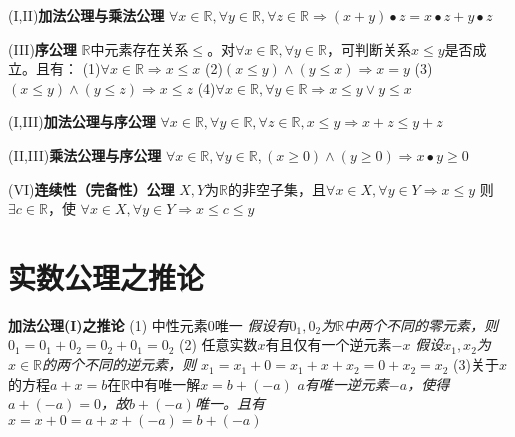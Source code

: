 \documentclass[11pt]{article}
\begin{document}
(I,II)\textbf{加法公理与乘法公理} \newline
$\forall x \in \mathbb{R}, \forall y \in \mathbb{R}, \forall z \in\mathbb{R} \Rightarrow (x+y) \bullet z=x \bullet z+y \bullet z$ \newline

(III)\textbf{序公理} \newline
$\mathbb{R}$中元素存在关系$\le$。对$\forall x \in \mathbb{R}, \forall y \in \mathbb{R}$，可判断关系$x \le y$是否成立。且有：\newline
(1)$\forall x \in \mathbb{R} \Rightarrow x \le x$ \newline
(2)$(x \le y) \land (y \le x) \Rightarrow x=y$ \newline
(3)$(x \le y) \land (y \le z) \Rightarrow x \le z$ \newline
(4)$\forall x \in \mathbb{R}, \forall y \in \mathbb{R} \Rightarrow x \le y \lor y \le x$ \newline

(I,III)\textbf{加法公理与序公理} \newline
$\forall x \in \mathbb{R}, \forall y \in \mathbb{R}, \forall z \in \mathbb{R}, x \le y \Rightarrow x+z \le y+z$ \newline

(II,III)\textbf{乘法公理与序公理} \newline
$\forall x \in \mathbb{R}, \forall y \in \mathbb{R}, (x \ge 0) \land (y \ge 0) \Rightarrow x \bullet y \ge 0$ \newline

(VI)\textbf{连续性（完备性）公理} \newline
$X, Y$为$\mathbb{R}$的非空子集，且$\forall x \in X, \forall y \in Y \Rightarrow x \le y$
则$\exists c \in \mathbb{R}$，使 \newline
$\forall x \in X, \forall y \in Y \Rightarrow x \le c \le y$ \newline

\section{实数公理之推论}
\textbf{加法公理(I)之推论} \newline
(1) 中性元素$0$唯一 \newline
\textit{假设有$0_1, 0_2$为$\mathbb{R}$中两个不同的零元素，则
$0_1=0_1+0_2=0_2+0_1=0_2$} \newline
(2) 任意实数$x$有且仅有一个逆元素$-x$ \newline
\textit{假设$x_1, x_2$为$x \in \mathbb{R}$的两个不同的逆元素，则
$x_1=x_1+0=x_1+x+x_2=0+x_2=x_2$} \newline
(3)关于$x$的方程$a+x=b$在$\mathbb{R}$中有唯一解$x=b+(-a)$ \newline
\textit{$a$有唯一逆元素$-a$，使得$a+(-a)=0$，故$b+(-a)$唯一。且有
$x=x+0=a+x+(-a)=b+(-a)$} \newline
\end{document}
